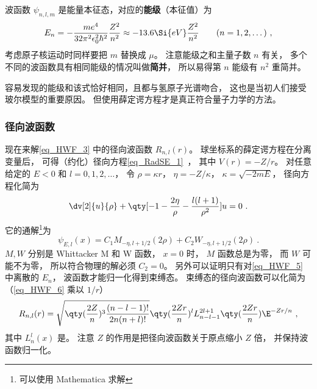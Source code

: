 波函数 $\psi_{n,l,m}$ 是能量本征态，对应的\textbf{能级}（本征值）为
\begin{equation}\label{eq_HWF_5}
E_n =  - \frac{m e^4}{32 \pi^2 \epsilon_0^2 \hbar ^2} \frac{Z^2}{n^2} \approx - 13.6\Si{eV} \frac{Z^2}{n^2}
\qquad (n = 1, 2, \dots)~,
\end{equation}
考虑原子核运动时同样要把 $m$ 替换成 $\mu$。 注意能级之和主量子数 $n$ 有关， 多个不同的波函数具有相同能级的情况叫做\textbf{简并}， 所以易得第 $n$ 能级有 $n^2$ 重简并。

容易发现的能级和该式恰好相同，且都与氢原子光谱吻合， 这也是当初人们接受玻尔模型的重要原因。 但使用薛定谔方程才是真正符合量子力学的方法。

\subsubsection{径向波函数}
现在来解\autoref{eq_HWF_3} 中的径向波函数 $R_{n,l}(r)$。 球坐标系的薛定谔方程在分离变量后， 可得（约化）径向方程\autoref{eq_RadSE_1}~， 其中 $V(r) = -Z/r$。 对任意给定的 $E < 0$ 和 $l = 0,1,2,\dots$， 令 $\rho = \kappa r$， $\eta = -Z/\kappa$， $\kappa = \sqrt{-2mE}$， 径向方程化简为
\begin{equation}\label{eq_HWF_11}
\dv[2]{u}{\rho} + \qty[-1 - \frac{2\eta}{\rho} - \frac{l(l+1)}{\rho^2}]u = 0~.
\end{equation}
它的通解\footnote{可以使用 Mathematica 求解}为
\begin{equation}\label{eq_HWF_6}
\psi_{E,l}(x) = C_1 M_{-\eta, l+1/2}(2 \rho) + C_2 W_{-\eta, l+1/2}(2 \rho)~.
\end{equation}
$M, W$ 分别是 Whittacker M 和 W 函数， $x = 0$ 时， $M$ 函数总是为零， 而 $W$ 可能不为零， 所以符合物理的解必须 $C_2 = 0$。 另外可以证明只有对\autoref{eq_HWF_5} 中离散的 $E_n$， 波函数才能归一化得到束缚态。 束缚态的径向波函数可以化简为（\autoref{eq_HWF_6} 乘以 $1/r$）
\begin{equation}\label{eq_HWF_2}
R_{n,l}(r) = \sqrt{\qty(\frac{2 Z}{n})^3 \frac{(n - l - 1)!}{2n (n + l)!}} \qty(\frac{2Zr}{n})^l  L_{n-l-1}^{2l+1}\qty(\frac{2Zr}{n}) \E^{-Zr/n}~,
\end{equation}
其中 $L_n^l(x)$ 是。 注意 $Z$ 的作用是把径向波函数关于原点缩小 $Z$ 倍， 并保持波函数归一化。

